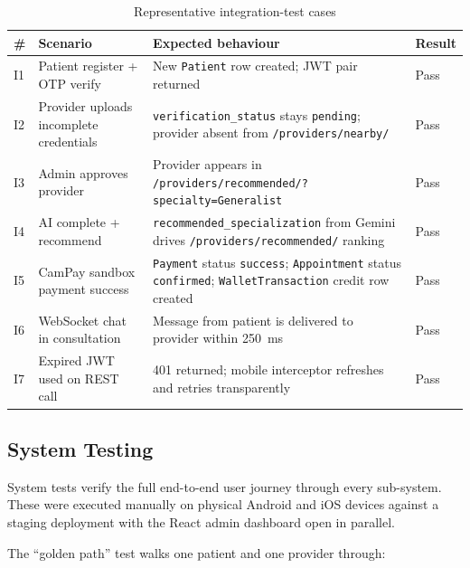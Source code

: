 \begin{table}[H]
\centering
\caption{Representative integration-test cases}
\label{tab:integration-tests}
\small
\begin{tabularx}{\textwidth}{|p{0.6cm}|p{4.8cm}|X|p{1.4cm}|}
\hline
\textbf{\#} & \textbf{Scenario} & \textbf{Expected behaviour} & \textbf{Result} \\ \hline

I1 & Patient register + OTP verify & New \texttt{Patient} row created; JWT pair returned & Pass \\ \hline
I2 & Provider uploads incomplete credentials & \texttt{verification\_status} stays \texttt{pending}; provider absent from \texttt{/providers/nearby/} & Pass \\ \hline
I3 & Admin approves provider & Provider appears in \texttt{/providers/recommended/?specialty=Generalist} & Pass \\ \hline
I4 & AI complete + recommend & \texttt{recommended\_specialization} from Gemini drives \texttt{/providers/recommended/} ranking & Pass \\ \hline
I5 & CamPay sandbox payment success & \texttt{Payment} status \texttt{success}; \texttt{Appointment} status \texttt{confirmed}; \texttt{WalletTransaction} credit row created & Pass \\ \hline
I6 & WebSocket chat in consultation & Message from patient is delivered to provider within 250~ms & Pass \\ \hline
I7 & Expired JWT used on REST call & 401 returned; mobile interceptor refreshes and retries transparently & Pass \\ \hline

\end{tabularx}
\end{table}

\subsection{System Testing}

System tests verify the full end-to-end user journey through every sub-system. These were executed manually on physical Android and iOS devices against a staging deployment with the React admin dashboard open in parallel.

The ``golden path'' test walks one patient and one provider through:

